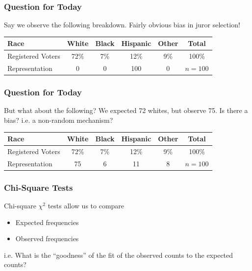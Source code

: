 \documentclass[handout]{beamer}
\newcommand{\blue}[1]{\textcolor{blue2}{#1}}
\begin{document}
\begin{frame}[fragile]
\frametitle{Question for Today}
Say we \blue{observe} the following breakdown.  Fairly obvious bias in juror selection!

\begin{center}
\begin{tabular}{l||cccc|c}
Race & White & Black & Hispanic & Other & Total \\ 
\hline
Registered Voters & 72\% & 7\% & 12\% & 9\% & 100\%\\ 
Representation & 0 & 0 & 100 & 0 & $n=100$ \\ 
\end{tabular}
\end{center}

\end{frame}


\begin{frame}[fragile]
\frametitle{Question for Today}

But what about the following?  We expected 72 whites, but observe 75.  Is there a bias?  i.e. a non-random mechanism?

\begin{center}
\begin{tabular}{l||cccc|c}
Race & White & Black & Hispanic & Other & Total \\ 
\hline
Registered Voters & 72\% & 7\% & 12\% & 9\% & 100\%\\ 
Representation & 75 & 6 & 11 & 8 & $n=100$ \\ 
\end{tabular}
\end{center}

\end{frame}


\begin{frame}[fragile]
\frametitle{Chi-Square Tests}

\blue{Chi-square $\chi^2$ tests} allow us to compare
\begin{itemize}
\item Expected frequencies
\item Observed frequencies
\end{itemize}

\vspace{0.5cm}

\pause i.e. What is the \blue{``goodness''} of the fit of the observed counts to the expected counts?



\end{frame}
\end{document}
